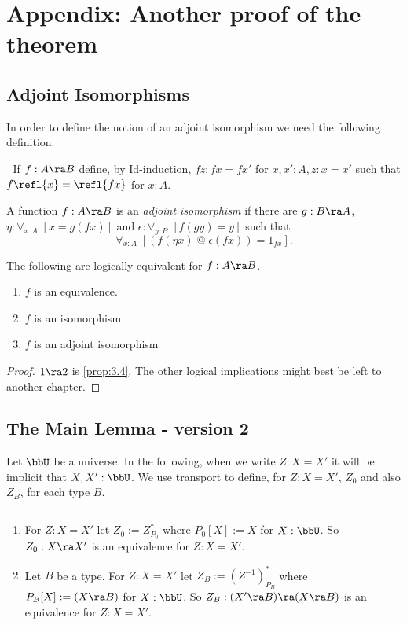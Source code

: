 
\section{Appendix: Another proof of the theorem}


\subsection{Adjoint  Isomorphisms}

In order to define the notion of an adjoint isomorphism we need the following definition.
\begin{defn} $\;$
If $f:A\ra B$ define, by Id-induction, $fz:fx=fx'$ for $x,x':A, z:x=x'$ such that $f\refl{x} = \refl{fx}$ for $x:A$.
\end{defn}

\begin{defn} A function $f:A\ra B$ is an {\em adjoint isomorphism} if there are $g:B\ra A$, $\eta:\forall_{x:A}\; [x=g(fx)]$ and $\epsilon:\forall_{y:B}\; [f(gy)=y]$ such that 
  \[\forall_{x:A}\;[(f(\eta x)\; @\;\epsilon(fx))=1_{fx}].\]
\end{defn}
\begin{prop}\label{prop:6.3} The following are logically equivalent for $f:A\ra B$.
\begin{enumerate}
\item $f$ is an equivalence.
\item $f$ is an isomorphism
\item $f$ is an adjoint isomorphism
\end{enumerate}
\end{prop}
\begin{proof} $1\ra 2$ is \autoref{prop:3.4}.  The other logical implications might best be left to another chapter.
\end{proof}

\subsection{The Main Lemma - version 2}
 Let $\bbU$ be a universe.  In the following, when we write $Z:X=X'$ it will be implicit that $X,X':\bbU$.  We use transport to define,  for $Z:X=X'$, $Z_0$ and also $Z_B$, for each type $B$. 
\begin{defn} $\;$\label{def:6.4}
\begin{enumerate}
\item For $Z:X=X'$ let $Z_0:= Z^*_{P_0}$ where $P_0[X]:=X$ for $X:\bbU$.  
So $Z_0:X\ra X'$ is an equivalence for  $Z:X=X'$.
\item Let $B$ be a type.  For $Z:X=X'$ let $Z_B:=(Z^{-1})^*_{P_B}$ where
$P_B[X]:=(X\ra B)$ for $X:\bbU$.  So $Z_B: (X'\ra B)\ra(X\ra B)$ is an equivalence for $Z:X=X'$.
\end{enumerate}
\end{defn}

